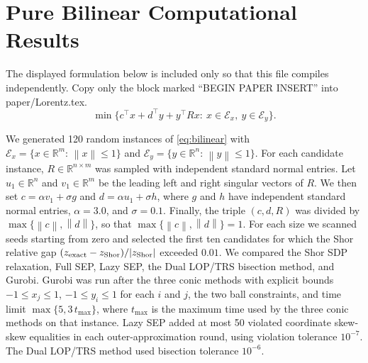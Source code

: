 \documentclass[11pt]{article}
\providecommand{\Rbb}{\mathbb{R}}
\providecommand{\Ecal}{\mathcal{E}}
\providecommand{\suchthat}{:\,}
\providecommand{\norm}[1]{\left\lVert #1\right\rVert}
\begin{document}
\section*{Pure Bilinear Computational Results}

The displayed formulation below is included only so that this file compiles
independently.  Copy only the block marked ``BEGIN PAPER INSERT'' into
paper/Lorentz.tex.
\begin{equation}
\label{eq:bilinear}
\min\{c^\top x+d^\top y+y^\top Rx:\ x\in\Ecal_x,\ y\in\Ecal_y\}.
\end{equation}

\noindent We generated 120 random instances of \eqref{eq:bilinear} with
\(\Ecal_x=\{x\in\Rbb^m\suchthat \norm{x}\le 1\}\) and
\(\Ecal_y=\{y\in\Rbb^n\suchthat \norm{y}\le 1\}\).  For each candidate instance, \(R\in\Rbb^{n\times m}\) was sampled with independent standard normal entries.  Let \(u_1\in\Rbb^n\) and \(v_1\in\Rbb^m\) be the leading left and right singular vectors of \(R\).  We then set \(c=\alpha v_1+\sigma g\) and \(d=\alpha u_1+\sigma h\), where \(g\) and \(h\) have independent standard normal entries, \(\alpha=3.0\), and \(\sigma=0.1\).  Finally, the triple \((c,d,R)\) was divided by \(\max\{\norm{c},\norm{d}\}\), so that \(\max\{\norm{c},\norm{d}\}=1\).
For each size we scanned seeds starting from zero and selected the first ten candidates for which the Shor relative gap \((z_{\rm exact}-z_{\rm Shor})/|z_{\rm Shor}|\) exceeded \(0.01\).  We compared the Shor SDP relaxation, Full SEP, Lazy SEP,
the Dual LOP/TRS bisection method, and Gurobi.
Gurobi was run after the three conic methods with explicit bounds
\(-1\le x_j\le 1\), \(-1\le y_i\le 1\) for each \(i\) and \(j\), the two
ball constraints, and time limit \(\max\{5,3\,t_{\max}\}\), where
\(t_{\max}\) is the maximum time used by the three conic methods on that
instance.  Lazy SEP added at most 50 violated coordinate skew-skew equalities
in each outer-approximation round, using violation tolerance \(10^{-7}\).
The Dual LOP/TRS method used bisection tolerance \(10^{-6}\).
\end{document}
